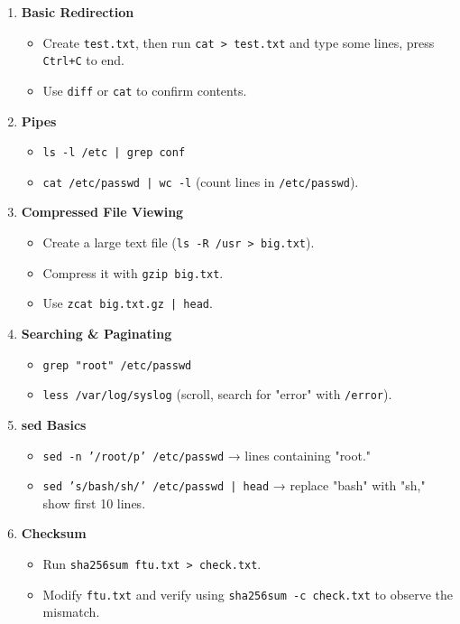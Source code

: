 \documentclass[a4paper]{report}
\begin{document}
\begin{enumerate}
    \item \textbf{Basic Redirection}
    \begin{itemize}
        \item Create \texttt{test.txt}, then run \texttt{cat > test.txt} and type some lines, press \texttt{Ctrl+C} to end.
        \item Use \texttt{diff} or \texttt{cat} to confirm contents.
    \end{itemize}

    \item \textbf{Pipes}
    \begin{itemize}
        \item \texttt{ls -l /etc | grep conf}
        \item \texttt{cat /etc/passwd | wc -l} (count lines in \texttt{/etc/passwd}).
    \end{itemize}

    \item \textbf{Compressed File Viewing}
    \begin{itemize}
        \item Create a large text file (\texttt{ls -R /usr > big.txt}).
        \item Compress it with \texttt{gzip big.txt}.
        \item Use \texttt{zcat big.txt.gz | head}.
    \end{itemize}

    \item \textbf{Searching \& Paginating}
    \begin{itemize}
        \item \texttt{grep "root" /etc/passwd}
        \item \texttt{less /var/log/syslog} (scroll, search for "error" with \texttt{/error}).
    \end{itemize}

    \item \textbf{sed Basics}
    \begin{itemize}
        \item \texttt{sed -n '/root/p' /etc/passwd} → lines containing "root."
        \item \texttt{sed 's/bash/sh/' /etc/passwd | head} → replace "bash" with "sh," show first 10 lines.
    \end{itemize}

    \item \textbf{Checksum}
    \begin{itemize}
        \item Run \texttt{sha256sum ftu.txt > check.txt}.
        \item Modify \texttt{ftu.txt} and verify using \texttt{sha256sum -c check.txt} to observe the mismatch.
    \end{itemize}


\end{enumerate}
\end{document}
